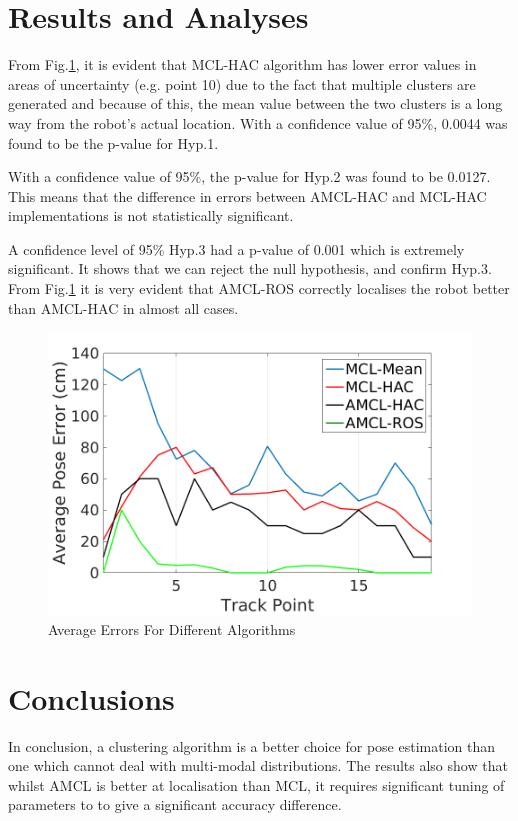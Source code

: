 \documentclass[a4paper, 10pt, conference]{ieeeconf}      %
\begin{document}
\section{Results and Analyses}

From Fig.\ref{fig:linegraph}, it is evident that MCL-HAC algorithm has lower error values in areas of uncertainty (e.g. point 10) due to the fact that multiple clusters are generated and because of this, the mean value between the two clusters is a long way from the robot's actual location. With a confidence value of 95\%, 0.0044 was found to be the p-value for Hyp.1.

With a confidence value of 95\%, the p-value for Hyp.2 was found to be 0.0127. This means that the difference in errors between AMCL-HAC and MCL-HAC implementations is not statistically significant.

A confidence level of 95\% Hyp.3 had a p-value of 0.001 which is extremely significant. It shows that we can reject the null hypothesis, and confirm Hyp.3. From Fig.\ref{fig:linegraph} it is very evident that AMCL-ROS correctly localises the robot better than AMCL-HAC in almost all cases.

\begin{figure}[b]
\centering
\captionsetup{justification=centering}
\includegraphics[scale=0.26]{PARTICLEFILT}
\caption{Average Errors For Different Algorithms}
\label{fig:linegraph}
\end{figure}

\section{Conclusions}
In conclusion, a clustering algorithm is a better choice for pose estimation than one which cannot deal with multi-modal distributions. The results also show that whilst AMCL is better at localisation than MCL, it requires significant tuning of parameters to to give a significant accuracy difference.
\end{document}
